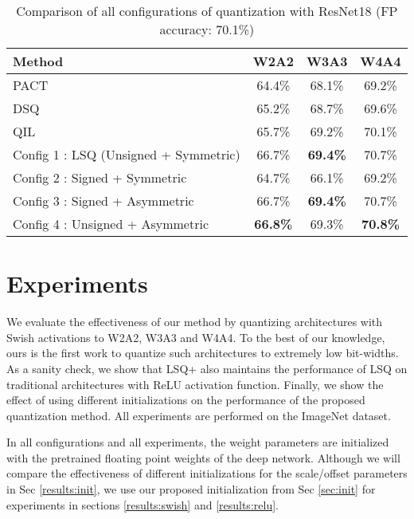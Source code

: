 \documentclass[10pt,twocolumn,letterpaper]{article}
\begin{document}
\begin{table*}[t]
	\caption{Comparison of all configurations of quantization with ResNet18 (FP accuracy: 70.1\%)}
\centering
	\begin{tabular}{l | c| c | c }
        \toprule
        	{Method} & {W2A2} & {W3A3} & {W4A4} \\
			
			\midrule
	
			PACT \cite{pact2018} & 64.4\% & 68.1\% & 69.2\% \\
			DSQ \cite{dsq} & 65.2\% & 68.7\% & 69.6\% \\
			QIL \cite{qil} & 65.7\% & 69.2\% & 70.1\% \\
			Config 1 : LSQ (Unsigned + Symmetric) & 66.7\% & \textbf{69.4\%} & 70.7\% \\
			Config 2 : Signed + Symmetric & 64.7\% & 66.1\% & 69.2\%  \\
			Config 3 : Signed + Asymmetric & 66.7\% & \textbf{69.4\%} & 70.7\%  \\
			Config 4 : Unsigned + Asymmetric & \textbf{66.8\%} & 69.3\% & \textbf{70.8\%} \\
        \bottomrule
	\end{tabular}
	\label{table:resnet}
\end{table*}

\section{Experiments}
We evaluate the effectiveness of our method by quantizing architectures with Swish activations to W2A2, W3A3 and W4A4. To the best of our knowledge, ours is the first work to quantize such architectures to extremely low bit-widths. As a sanity check, we show that LSQ+ also maintains the performance of LSQ \cite{lsq} on traditional architectures with ReLU activation function. Finally, we show the effect of using different initializations on the performance of the proposed quantization method. All experiments are performed on the ImageNet \cite{ILSVRC15} dataset.

In all configurations and all experiments, the weight parameters are initialized with the pretrained floating point weights of the deep network. Although we will compare the effectiveness of different initializations for the scale/offset parameters in Sec \ref{results:init}, we use our proposed initialization from Sec \ref{sec:init}  for experiments in sections \ref{results:swish} and \ref{results:relu}.
\end{document}
